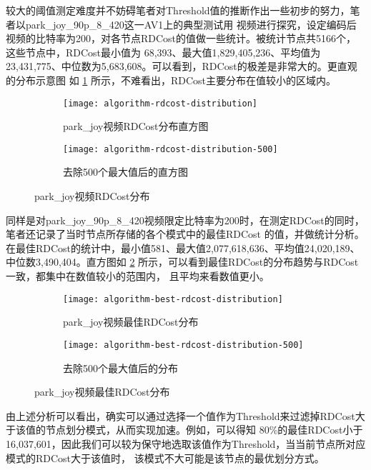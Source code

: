 较大的阈值测定难度并不妨碍笔者对Threshold值的推断作出一些初步的努力，笔者以park\_joy\_90p\_8\_420这一AV1上的典型测试用
视频进行探究，设定编码后视频的比特率为200，对各节点RDCost的值做一些统计。被统计节点共5166个，这些节点中，RDCost最小值为
68,393、最大值1,829,405,236、平均值为23,431,775、中位数为5,683,608。可以看到，RDCost的极差是非常大的。更直观的分布示意图
如 \ref{fig:algorithm-rdcost-distribution} 所示，不难看出，RDCost主要分布在值较小的区域内。

\begin{figure}[H]
  \centering%
  \begin{subfigure}{0.43\textwidth}
    \centering
    \texttt{[image: algorithm-rdcost-distribution]}
    \caption{park\_joy视频RDCost分布直方图}
  \end{subfigure}%
  \hspace{2em}%
  \begin{subfigure}{0.43\textwidth}
    \centering
    \texttt{[image: algorithm-rdcost-distribution-500]}
    \caption{去除500个最大值后的直方图}
  \end{subfigure}
  \caption{park\_joy视频RDCost分布}
  \label{fig:algorithm-rdcost-distribution}
\end{figure}

同样是对park\_joy\_90p\_8\_420视频限定比特率为200时，在测定RDCost的同时，笔者还记录了当时节点所存储的各个模式中的最佳RDCost
的值，并做统计分析。在最佳RDCost的统计中，最小值581、最大值2,077,618,636、平均值24,020,189、中位数3,490,404。直方图如 
\ref{fig:algorithm-best-rdcost-distribution} 所示，可以看到最佳RDCost的分布趋势与RDCost一致，都集中在数值较小的范围内，
且平均来看数值更小。

\begin{figure}[H]
  \centering%
  \begin{subfigure}{0.43\textwidth}
    \centering
    \texttt{[image: algorithm-best-rdcost-distribution]}
    \caption{park\_joy视频最佳RDCost分布}
  \end{subfigure}%
  \hspace{2em}%
  \begin{subfigure}{0.43\textwidth}
    \centering
    \texttt{[image: algorithm-best-rdcost-distribution-500]}
    \caption{去除500个最大值后的分布}
  \end{subfigure}
  \caption{park\_joy视频最佳RDCost分布}
  \label{fig:algorithm-best-rdcost-distribution}
\end{figure}

由上述分析可以看出，确实可以通过选择一个值作为Threshold来过滤掉RDCost大于该值的节点划分模式，从而实现加速。例如，可以得知
80\%的最佳RDCost小于16,037,601，因此我们可以较为保守地选取该值作为Threshold，当当前节点所对应模式的RDCost大于该值时，
该模式不大可能是该节点的最优划分方式。

